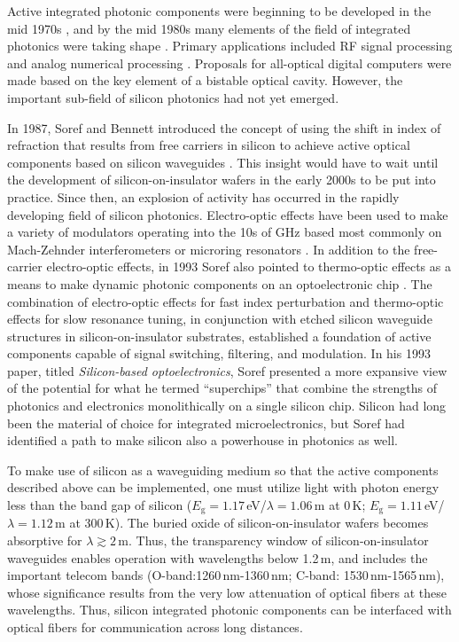 \vspace{3em}
Active integrated photonic components were beginning to be developed in the mid 1970s \cite{ohno1975}, and by the mid 1980s many elements of the field of integrated photonics were taking shape \cite{ve1984}. Primary applications included RF signal processing and analog numerical processing \cite{ve1984}. Proposals for all-optical digital computers were made based on the key element of a bistable optical cavity. However, the important sub-field of silicon photonics had not yet emerged.

\vspace{3em}
In 1987, Soref and Bennett introduced the concept of using the shift in index of refraction that results from free carriers in silicon to achieve active optical components based on silicon waveguides \cite{sobe1987}. This insight would have to wait until the development of silicon-on-insulator wafers in the early 2000s to be put into practice. Since then, an explosion of activity has occurred in the rapidly developing field of silicon photonics. Electro-optic effects have been used to make a variety of modulators \cite{rema2010} operating into the 10s of GHz based most commonly on Mach-Zehnder interferometers \cite{lisa2005} or microring resonators \cite{xuma2007}. In addition to the free-carrier electro-optic effects, in 1993 Soref also pointed to thermo-optic effects as a means to make dynamic photonic components on an optoelectronic chip \cite{so1993}. The combination of electro-optic effects for fast index perturbation and thermo-optic effects for slow resonance tuning, in conjunction with etched silicon waveguide structures in silicon-on-insulator substrates, established a foundation of active components capable of signal switching, filtering, and modulation. In his 1993 paper, titled \textit{Silicon-based optoelectronics}, Soref presented a more expansive view of the potential for what he termed ``superchips'' that combine the strengths of photonics and electronics monolithically on a single silicon chip. Silicon had long been the material of choice for integrated microelectronics, but Soref had identified a path to make silicon also a powerhouse in photonics as well.

To make use of silicon as a waveguiding medium so that the active components described above can be implemented, one must utilize light with photon energy less than the band gap of silicon ($E_{\mathrm{g}}=1.17$\,eV/$\lambda = 1.06$\,\textmu m at 0\,K; $E_{\mathrm{g}}=1.11$\,eV/$\lambda = 1.12$\,\textmu m at 300\,K). The buried oxide of silicon-on-insulator wafers becomes absorptive for $\lambda \gtrsim 2$\,\textmu m. Thus, the transparency window of silicon-on-insulator waveguides enables operation with wavelengths below 1.2\,\textmu m, and includes the important telecom bands (O-band:1260\,nm-1360\,nm; C-band: 1530\,nm-1565\,nm), whose significance results from the very low attenuation of optical fibers at these wavelengths. Thus, silicon integrated photonic components can be interfaced with optical fibers for communication across long distances. 

